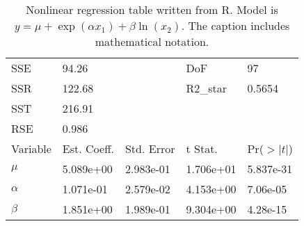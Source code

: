\begin{table}[h!]
\caption[NLS table all from R]{Nonlinear regression table written from R. Model is $y = \mu + \exp(\alpha x_1) + \beta \ln(x_2)$. The caption includes mathematical notation.}\label{nls2}\begin{center}
\begin{tabular}{l l l l l}

\hline
SSE	&	94.26	&		&	DoF	&	97\\ 
SSR	&	122.68	&		&	R2\_star	&	0.5654\\ 
SST	&	216.91	&		&		&	\\ 
RSE	&	0.986	&		&		&	\\ 
\hline
Variable	&	Est. Coeff.	&	Std. Error	&	t Stat.	&	Pr($>|t|$)\\ 
\hline
$\mu$	&	5.089e+00	&	2.983e-01	&	1.706e+01	&	5.837e-31\\ 
$\alpha$	&	1.071e-01	&	2.579e-02	&	4.153e+00	&	7.06e-05\\ 
$\beta$	&	1.851e+00	&	1.989e-01	&	9.304e+00	&	4.28e-15\\ 
\hline\end{tabular}
\end{center}
\end{table}